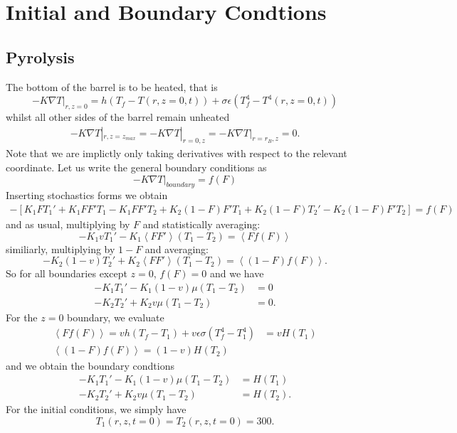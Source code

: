 \documentclass[12pt]{article}
\begin{document}
\section{Initial and Boundary Condtions}
\subsection{Pyrolysis}
The bottom of the barrel is to be heated, that is 
\begin{equation}
    -  K \nabla T|_{r,z=0}=h\left(T_f-T(r,z=0,t)\right)+\sigma \epsilon (T_f^4-T^4(r,z=0,t))
\end{equation}
whilst all other sides of the barrel remain unheated 
\begin{align}
    -K \nabla T|_{r,z=z_{max}} =-K\nabla T|_{r=0,z}=-K \nabla T|_{r=r_B,z}=0.
\end{align}
Note that we are implictly only taking derivatives with respect to the relevant coordinate. Let us write the general boundary conditions as
\begin{equation}
    -K\nabla T |_{boundary} = f(F)
\end{equation}
Inserting stochastics forms we obtain 
\begin{align}
    -\left[ K_1 F T_1' +K_1 FF' T_1-K_1FF'T_2+K_2(1-F)F'T_1+K_2(1-F)T_2'-K_2(1-F)F'T_2           \right] =f(F)
\end{align}  
and as usual, multiplying by $F$ and statistically averaging: 
\begin{equation}
    -K_1 v T_1' -K_1 \left< FF' \right>(T_1-T_2)=\left< Ff(F)\right>
\end{equation}
similiarly, multiplying by $1-F$ and averaging:
\begin{equation}
    -K_2 (1-v) T_2' +K_2 \left < FF' \right > (T_1 -T_2) = \left< (1-F)f(F)\right >.
\end{equation}
So for all boundaries except $z=0$, $f(F)=0$ and we have 
\begin{align}
    -K_1  T_1' -K_1 (1-v)\mu(T_1-T_2)&=0 \\
    -K_2  T_2' +K_2 v\mu (T_1 -T_2) &=0.
\end{align}
For the $z=0$ boundary, we evaluate 
\begin{align}
    \left < Ff(F)\right >=vh(T_f-T_1) +v\epsilon \sigma (T_f^4 -T_1 ^4)&=vH(T_1) \\
     \left < (1-F)f(F)\right >= (1-v)H(T_2)
\end{align}
and we obtain the boundary condtions 
\begin{align}
    -K_1  T_1' -K_1 (1-v)\mu(T_1-T_2)&=H(T_1) \\
    -K_2  T_2' +K_2 v\mu (T_1 -T_2) &=H(T_2).
\end{align}
For the initial conditions, we simply have 
\begin{equation}
    T_1(r,z,t=0)=T_2(r,z,t=0)=300 .
\end{equation}
\end{document}
